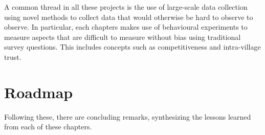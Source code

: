 A common thread in all these projects is the use of large-scale data collection using novel methods to collect data that would otherwise be hard to observe to observe. In particular, each chapters makes  use of behavioural experiments to measure aspects that are difficult to measure without bias using traditional survey questions. This includes concepts such as competitiveness and intra-village trust.

\section{Roadmap}
Following these, there are concluding remarks, synthesizing the lessons learned from each of these chapters.

\clearpage 

